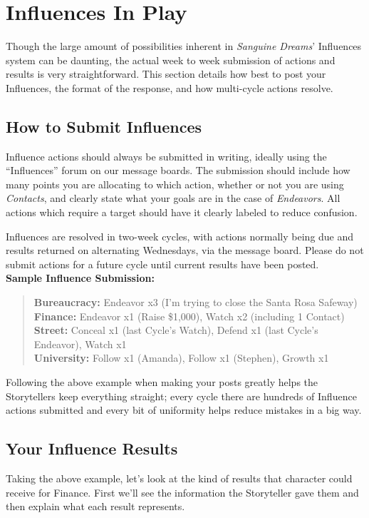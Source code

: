 \section{Influences In Play}
Though the large amount of possibilities inherent in \emph{Sanguine Dreams}' Influences system can be daunting, 
the actual week to week submission of actions and results is very straightforward. This section details how best 
to post your Influences, the format of the response, and how multi-cycle actions resolve.

\subsection{How to Submit Influences}
Influence actions should always be submitted in writing, ideally using the ``Influences'' forum on our message boards.  
The submission should include how many points you are allocating to which action, whether or not you are using 
\emph{Contacts}, and clearly state what your goals are in the case of \emph{Endeavors}.  All actions which require a 
target should have it clearly labeled to reduce confusion. 

Influences are resolved in two-week cycles, with actions normally being due and results returned on alternating 
Wednesdays, via the message board.  Please do not submit actions for a future cycle until current results have 
been posted. \\

\noindent\textbf{Sample Influence Submission:}

\begin{quote}
	\textbf{Bureaucracy:} Endeavor x3 (I'm trying to close the Santa Rosa Safeway) \\
	\textbf{Finance:} Endeavor x1 (Raise \$1,000), Watch x2 (including 1 Contact) \\
	\textbf{Street:} Conceal x1 (last Cycle's Watch), Defend x1 (last Cycle's Endeavor), Watch x1 \\
	\textbf{University:} Follow x1 (Amanda), Follow x1 (Stephen), Growth x1
\end{quote}

\noindent Following the above example when making your posts greatly helps the Storytellers keep everything straight; every 
cycle there are hundreds of Influence actions submitted and every bit of uniformity helps reduce mistakes in a big way.

\subsection{Your Influence Results}
Taking the above example, let's look at the kind of results that character could receive for Finance.  First we'll 
see the information the Storyteller gave them and then explain what each result represents.

